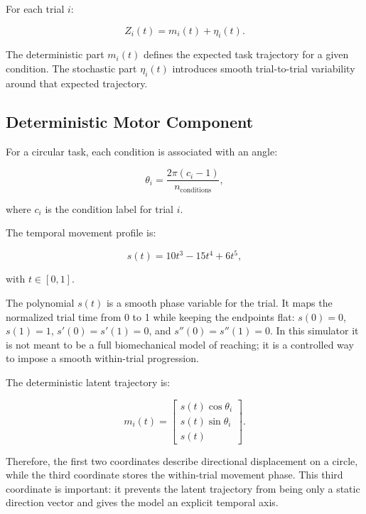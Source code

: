 \documentclass[11pt]{article}
\begin{document}
For each trial $i$:

\begin{equation}
Z_i(t) = m_i(t) + \eta_i(t).
\end{equation}

The deterministic part $m_i(t)$ defines the expected task trajectory for a
given condition. The stochastic part $\eta_i(t)$ introduces smooth
trial-to-trial variability around that expected trajectory.

\subsection{Deterministic Motor Component}

For a circular task, each condition is associated with an angle:

\begin{equation}
\theta_i = \frac{2\pi (c_i-1)}{n_{\text{conditions}}},
\end{equation}

where $c_i$ is the condition label for trial $i$.

The temporal movement profile is:

\begin{equation}
s(t) = 10t^3 - 15t^4 + 6t^5,
\end{equation}

with $t \in [0,1]$.

The polynomial $s(t)$ is a smooth phase variable for the trial. It maps the
normalized trial time from 0 to 1 while keeping the endpoints flat:
$s(0)=0$, $s(1)=1$, $s'(0)=s'(1)=0$, and
$s''(0)=s''(1)=0$. In this simulator it is not meant to be a full
biomechanical model of reaching; it is a controlled way to impose a smooth
within-trial progression.

The deterministic latent trajectory is:

\begin{equation}
m_i(t) =
\begin{bmatrix}
s(t)\cos\theta_i\\
s(t)\sin\theta_i\\
s(t)
\end{bmatrix}.
\end{equation}

Therefore, the first two coordinates describe directional displacement on a
circle, while the third coordinate stores the within-trial movement phase. This
third coordinate is important: it prevents the latent trajectory from being
only a static direction vector and gives the model an explicit temporal axis.
\end{document}
